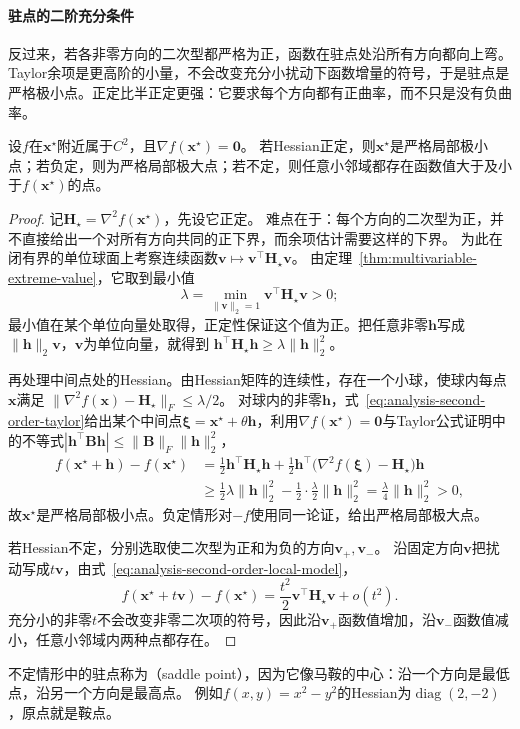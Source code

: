 \paragraph{驻点的二阶充分条件}
反过来，若各非零方向的二次型都严格为正，函数在驻点处沿所有方向都向上弯。Taylor余项是更高阶的小量，不会改变充分小扰动下函数增量的符号，于是驻点是严格极小点。正定比半正定更强：它要求每个方向都有正曲率，而不只是没有负曲率。
\begin{theorem}[驻点的Hessian判别]
\label{thm:multivariable-hessian-classification}
设$f$在$\bm x^\star$附近属于$C^2$，且$\nabla f(\bm x^\star)=\bm 0$。
若Hessian正定，则$\bm x^\star$是严格局部极小点；若负定，则为严格局部极大点；若不定，则任意小邻域都存在函数值大于及小于$f(\bm x^\star)$的点。
\end{theorem}
\begin{proof}
记$\bm H_\star=\nabla^2f(\bm{x}^{\star})$，先设它正定。
难点在于：每个方向的二次型为正，并不直接给出一个对所有方向共同的正下界，而余项估计需要这样的下界。
为此在闭有界的单位球面上考察连续函数$\bm v\mapsto\bm v^\top\bm H_\star\bm v$。
由定理~\ref{thm:multivariable-extreme-value}，它取到最小值
\[
 \lambda=\min_{\lVert\bm v\rVert_2=1}\bm v^\top\bm H_\star\bm v>0;
\]
最小值在某个单位向量处取得，正定性保证这个值为正。把任意非零$\bm h$写成$\lVert\bm h\rVert_2\bm v$，$\bm v$为单位向量，就得到
$\bm h^\top\bm H_\star\bm h\geq\lambda\lVert\bm h\rVert_2^2$。

再处理中间点处的Hessian。由Hessian矩阵的连续性，存在一个小球，使球内每点$\bm x$满足
$\lVert\nabla^2f(\bm x)-\bm H_\star\rVert_F\leq\lambda/2$。
对球内的非零$\bm h$，式~\eqref{eq:analysis-second-order-taylor}给出某个中间点$\bm\xi=\bm x^\star+\theta\bm h$，利用$\nabla f(\bm x^\star)=\bm 0$与Taylor公式证明中的不等式$|\bm h^\top\bm B\bm h|\leq\lVert\bm B\rVert_F\lVert\bm h\rVert_2^2$，
\[
 \begin{aligned}
 f(\bm{x}^{\star}+\bm{h})-f(\bm{x}^{\star})
 &=\frac12\bm h^\top\bm H_\star\bm h+\frac12\bm h^\top\bigl(\nabla^2f(\bm\xi)-\bm H_\star\bigr)\bm h\\
 &\geq\frac12\lambda\lVert\bm h\rVert_2^2-\frac12\cdot\frac{\lambda}{2}\lVert\bm h\rVert_2^2
 =\frac{\lambda}{4}\lVert\bm{h}\rVert_2^2>0,
 \end{aligned}
\]
故$\bm{x}^{\star}$是严格局部极小点。负定情形对$-f$使用同一论证，给出严格局部极大点。

若Hessian不定，分别选取使二次型为正和为负的方向$\bm v_+,\bm v_-$。
沿固定方向$\bm v$把扰动写成$t\bm v$，由式~\eqref{eq:analysis-second-order-local-model}，
\[
 f(\bm x^\star+t\bm v)-f(\bm x^\star)=\frac{t^2}{2}\bm v^\top\bm H_\star\bm v+o(t^2).
\]
充分小的非零$t$不会改变非零二次项的符号，因此沿$\bm v_+$函数值增加，沿$\bm v_-$函数值减小，任意小邻域内两种点都存在。
\end{proof}
不定情形中的驻点称为（saddle point），因为它像马鞍的中心：沿一个方向是最低点，沿另一个方向是最高点。
例如$f(x,y)=x^2-y^2$的Hessian为$\operatorname{diag}(2,-2)$，原点就是鞍点。

